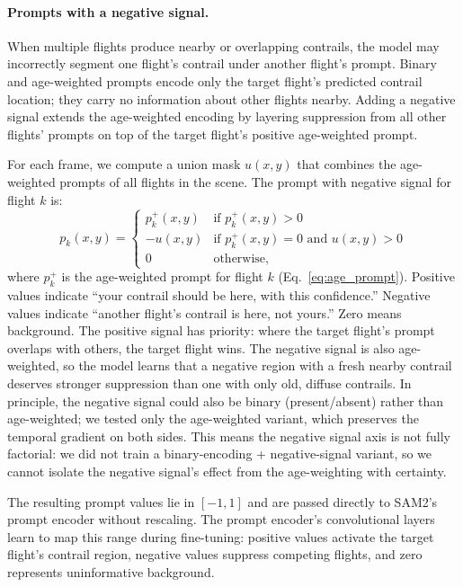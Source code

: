 \documentclass[review]{elsarticle}
\begin{document}
\paragraph{Prompts with a negative signal.} When multiple flights produce nearby or overlapping contrails, the model may incorrectly segment one flight's contrail under another flight's prompt. Binary and age-weighted prompts encode only the target flight's predicted contrail location; they carry no information about other flights nearby. Adding a negative signal extends the age-weighted encoding by layering suppression from all other flights' prompts on top of the target flight's positive age-weighted prompt.

For each frame, we compute a union mask $u(x,y)$ that combines the age-weighted prompts of all flights in the scene. The prompt with negative signal for flight $k$ is:
\begin{equation}
    p_k(x, y) = \begin{cases}
        p_k^+(x, y) & \text{if } p_k^+(x, y) > 0 \\
        -u(x, y)    & \text{if } p_k^+(x, y) = 0 \text{ and } u(x,y) > 0 \\
        0            & \text{otherwise,}
    \end{cases}
\label{eq:neg_prompt}
\end{equation}
where $p_k^+$ is the age-weighted prompt for flight $k$ (Eq.~\ref{eq:age_prompt}). Positive values indicate ``your contrail should be here, with this confidence.'' Negative values indicate ``another flight's contrail is here, not yours.'' Zero means background. The positive signal has priority: where the target flight's prompt overlaps with others, the target flight wins. The negative signal is also age-weighted, so the model learns that a negative region with a fresh nearby contrail deserves stronger suppression than one with only old, diffuse contrails. In principle, the negative signal could also be binary (present/absent) rather than age-weighted; we tested only the age-weighted variant, which preserves the temporal gradient on both sides. This means the negative signal axis is not fully factorial: we did not train a binary-encoding + negative-signal variant, so we cannot isolate the negative signal's effect from the age-weighting with certainty.

The resulting prompt values lie in $[-1, 1]$ and are passed directly to SAM2's prompt encoder without rescaling. The prompt encoder's convolutional layers learn to map this range during fine-tuning: positive values activate the target flight's contrail region, negative values suppress competing flights, and zero represents uninformative background.
\end{document}
